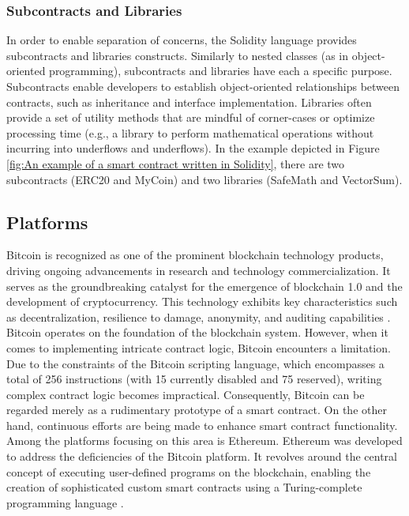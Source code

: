 \subsubsection{Subcontracts and Libraries}

In order to enable separation of concerns, the Solidity language provides subcontracts and libraries constructs. Similarly to nested classes (as in object-oriented programming), subcontracts and libraries have each a specific purpose. Subcontracts enable developers to establish object-oriented relationships between contracts, such as inheritance and interface implementation. Libraries often provide a set of utility methods that are mindful of corner-cases or optimize processing time (e.g., a library to perform mathematical operations without incurring into underflows and underflows). In the example depicted in Figure \ref{fig:An example of a smart contract written in Solidity}, there are two subcontracts (ERC20 and MyCoin) and two libraries (SafeMath and VectorSum).

\subsection{Platforms}

Bitcoin is recognized as one of the prominent blockchain technology products, driving ongoing advancements in research and technology commercialization. It serves as the groundbreaking catalyst for the emergence of blockchain 1.0 and the development of cryptocurrency. This technology exhibits key characteristics such as decentralization, resilience to damage, anonymity, and auditing capabilities \cite{dmitry_roschin_blockchain}. Bitcoin operates on the foundation of the blockchain system. However, when it comes to implementing intricate contract logic, Bitcoin encounters a limitation. Due to the constraints of the Bitcoin scripting language, which encompasses a total of 256 instructions (with 15 currently disabled and 75 reserved), writing complex contract logic becomes impractical. Consequently, Bitcoin can be regarded merely as a rudimentary prototype of a smart contract. On the other hand, continuous efforts are being made to enhance smart contract functionality. Among the platforms focusing on this area is Ethereum. Ethereum was developed to address the deficiencies of the Bitcoin platform. It revolves around the central concept of executing user-defined programs on the blockchain, enabling the creation of sophisticated custom smart contracts using a Turing-complete programming language \cite{shuai_smart_contract}.

